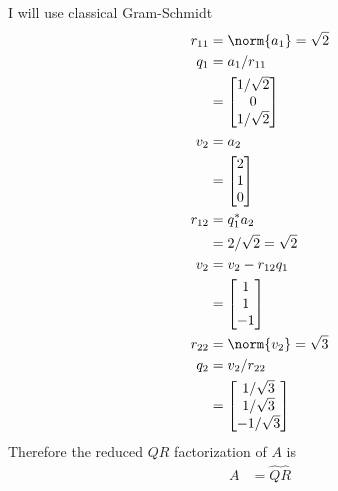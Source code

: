 \documentclass[11pt]{article}
\begin{document}
\begin{enumerate}
\begin{enumerate}
                I will use classical Gram-Schmidt
                \begin{align*}
                    r_{11} &= \norm{a_1} = \sqrt{2} \\
                    q_1 &= a_1/r_{11} \\
                    &= 
                    \begin{bmatrix}
                        1/\sqrt{2} \\
                        0 \\
                        1/\sqrt{2}
                    \end{bmatrix} \\
                    v_2 &= a_2 \\
                    &= 
                    \begin{bmatrix}
                        2 \\
                        1 \\
                        0
                    \end{bmatrix} \\
                    r_{12} &= q_1^* a_2 \\
                    &= 2/\sqrt{2} = \sqrt{2} \\
                    v_2 &= v_2 - r_{12}q_1 \\
                    &= 
                    \begin{bmatrix}
                        1 \\
                        1 \\
                        -1
                    \end{bmatrix} \\
                    r_{22} &= \norm{v_2} = \sqrt{3} \\
                    q_2 &= v_2/r_{22} \\
                    &=
                    \begin{bmatrix}
                        1/\sqrt{3} \\
                        1/\sqrt{3} \\
                        -1/\sqrt{3}
                    \end{bmatrix}
                \end{align*}
                Therefore the reduced $QR$ factorization of $A$ is
                \begin{align*}
                    A &= \hat{Q} \hat{R} \\

\end{align*}
\end{enumerate}
\end{enumerate}
\end{document}
